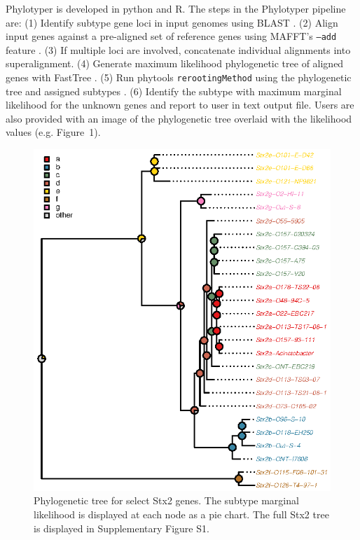 \documentclass{bioinfo}
\begin{document}
Phylotyper is developed in python and R. 
The steps in the Phylotyper pipeline are: 
(1) Identify subtype gene loci in input genomes using BLAST \citep{Camacho2009}.
(2) Align input genes against a pre-aligned set of reference genes using MAFFT's \texttt{--add} feature \citep{Katoh2013}.
(3) If multiple loci are involved, concatenate individual alignments into superalignment.
(4) Generate maximum likelihood phylogenetic tree of aligned genes with FastTree \citep{Price2010}.
(5) Run phytools \texttt{rerootingMethod} using the phylogenetic tree and assigned subtypes \citep{Revell2011}.
(6) Identify the subtype with maximum marginal likelihood for the unknown genes and report to user in text output file.
Users are also provided with an image of the phylogenetic tree overlaid with the likelihood values (e.g. Figure~1\vphantom{\ref{fig:01}}).

\begin{figure}[!tpb]%
\centerline{\includegraphics{fig01.eps}}
\caption{Phylogenetic tree for select Stx2 genes. 
The subtype marginal likelihood is displayed at each node as a pie chart.
The full Stx2 tree is displayed in Supplementary Figure S1.}\label{fig:01}
\end{figure}
\end{document}
